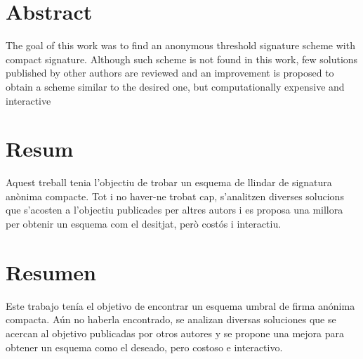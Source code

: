 \section*{Abstract}

The goal of this work was to find an anonymous threshold signature scheme with compact signature. Although such scheme is not found in this work, few solutions published by other authors are reviewed and an improvement is proposed to obtain a scheme similar to the desired one, but computationally expensive and interactive

\section*{Resum}

Aquest treball tenia l'objectiu de trobar un esquema de llindar de signatura an\`onima compacte. Tot i no haver-ne trobat cap, s'analitzen diverses solucions que s'acosten a l'objectiu publicades per altres autors i es proposa una millora per obtenir un esquema com el desitjat, per\`o costós i interactiu.

\section*{Resumen}

Este trabajo tenía el objetivo de encontrar un esquema umbral de firma anónima compacta. Aún no haberla encontrado, se analizan diversas soluciones que se acercan al objetivo publicadas por otros autores y se propone una mejora para obtener un esquema como el deseado, pero costoso e interactivo.